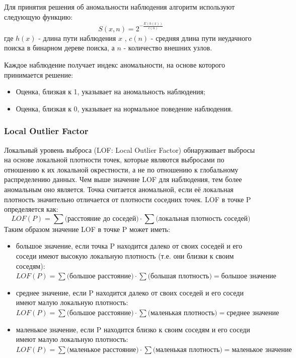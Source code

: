 \documentclass[12pt]{article}
\begin{document}
    \par Для принятия решения об аномальности наблюдения алгоритм используют следующую функцию:
    $$
    S(x,n) = 2^{-\frac{E(h(x))}{c(n)}}
    $$
    \noindent где $h(x)$ - длина пути наблюдения $x$ , $c(n)$ - средняя длина пути неудачного поиска в бинарном дереве поиска, а $n$ - количество внешних узлов. \\

    \par Каждое наблюдение получает индекс аномальности, на основе которого принимается решение:
    \begin{itemize}
        \item Оценка, близкая к 1, указывает на аномальность наблюдения;
        \item Оценка, близкая к 0, указывает на нормальное поведение наблюдения.
    \end{itemize}


    \subsubsection{Local Outlier Factor}
    \label{sec:Research:Model:LocalOutlierFactor}

    Локальный уровень выброса (LOF: Local Outlier Factor) обнаруживает выбросы на основе локальной плотности точек, которые являются выбросами по отношению к их локальной окрестности, а не по отношению к глобальному распределению данных. Чем выше значение LOF для наблюдения, тем более аномальным оно является. Точка считается аномальной, если её локальная плотность значительно отличается от плотности соседних точек. LOF в точке P определяется как:
    $$
    LOF(P) = \sum \text{(расстояние до соседей)} \cdot \sum \text{(локальная плотность соседей)}
    $$
    Таким образом значение LOF в точке P может иметь:
    \begin{itemize}
        \item большое значение, если точка P находится далеко от своих соседей и его соседи имеют высокую локальную плотность (т.е. они близки к своим соседям): \\ 
        $ LOF(P) = \sum {\text{(большое расстояние)}} \cdot \sum \text{(большая плотность)} = \text{большое значение}$
        \item среднее значение, если P находится далеко от своих соседей и его соседи имеют малую локальную плотность: \\
        $ LOF(P) = \sum \text{(большое расстояние)} \cdot \sum \text{(маленькая плотность)} = \text{среднее значение} $
        \item маленькое значение, если P находится близко к своим соседям и его соседи имеют малую локальную плотность: \\
        $ LOF(P) = \sum \text{(маленькое расстояние)} \cdot \sum \text{(маленькая плотность)} = \text{маленькое значение} $
    \end{itemize}
    
\end{document}
